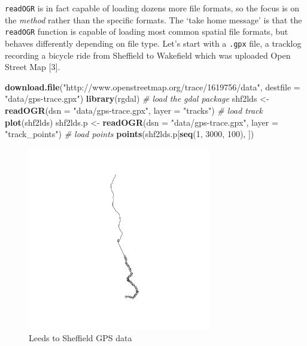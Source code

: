 \documentclass[]{article}
\newenvironment{Shaded}{}{}
\newcommand{\KeywordTok}[1]{\textcolor[rgb]{0.00,0.44,0.13}{\textbf{{#1}}}}
\newcommand{\DataTypeTok}[1]{\textcolor[rgb]{0.56,0.13,0.00}{{#1}}}
\newcommand{\DecValTok}[1]{\textcolor[rgb]{0.25,0.63,0.44}{{#1}}}
\newcommand{\StringTok}[1]{\textcolor[rgb]{0.25,0.44,0.63}{{#1}}}
\newcommand{\CommentTok}[1]{\textcolor[rgb]{0.38,0.63,0.69}{\textit{{#1}}}}
\newcommand{\NormalTok}[1]{{#1}}
\let\Oldincludegraphics\includegraphics
\renewcommand{\includegraphics}[1]{\Oldincludegraphics[width=8cm]{#1}}
\begin{document}
\texttt{readOGR} is in fact capable of loading dozens more file formats,
so the focus is on the \emph{method} rather than the specific formats.
The `take home message' is that the \texttt{readOGR} function is capable
of loading most common spatial file formats, but behaves differently
depending on file type. Let's start with a \texttt{.gpx} file, a
tracklog recording a bicycle ride from Sheffield to Wakefield which was
uploaded Open Street Map {[}3{]}.

\begin{Shaded}
\begin{Highlighting}[]
\KeywordTok{download.file}\NormalTok{(}\StringTok{"http://www.openstreetmap.org/trace/1619756/data"}\NormalTok{, }\DataTypeTok{destfile =} \StringTok{"data/gps-trace.gpx"}\NormalTok{)}
\KeywordTok{library}\NormalTok{(rgdal)  }\CommentTok{# load the gdal package}
\NormalTok{shf2lds <- }\KeywordTok{readOGR}\NormalTok{(}\DataTypeTok{dsn =} \StringTok{"data/gps-trace.gpx"}\NormalTok{, }\DataTypeTok{layer =} \StringTok{"tracks"}\NormalTok{)  }\CommentTok{# load track}
\KeywordTok{plot}\NormalTok{(shf2lds)}
\NormalTok{shf2lds.p <- }\KeywordTok{readOGR}\NormalTok{(}\DataTypeTok{dsn =} \StringTok{"data/gps-trace.gpx"}\NormalTok{, }\DataTypeTok{layer =} \StringTok{"track_points"}\NormalTok{)  }\CommentTok{# load points}
\KeywordTok{points}\NormalTok{(shf2lds.p[}\KeywordTok{seq}\NormalTok{(}\DecValTok{1}\NormalTok{, }\DecValTok{3000}\NormalTok{, }\DecValTok{100}\NormalTok{), ])}
\end{Highlighting}
\end{Shaded}
\begin{figure}[htbp]
\centering
\includegraphics{figure/Leeds_to_Sheffield_GPS_data.png}
\caption{Leeds to Sheffield GPS data}
\end{figure}
\end{document}
